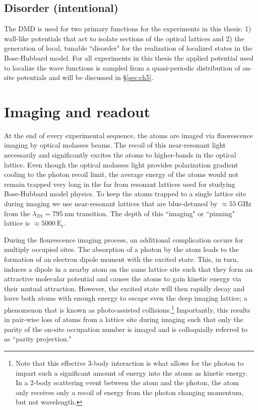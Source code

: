 \subsection{Disorder (intentional)}

The DMD is used for two primary functions for the experiments in this thesis: 1) wall-like potentials that act to isolate sections of the optical lattices and 2) the generation of local, tunable ``disorder" for the realization of localized states in the Bose-Hubbard model. For all experiments in this thesis the applied potential used to localize the wave functions is sampled from a quasi-periodic distribution of on-site potentials and will be discussed in \S \ref{sec:ch5}.

\section{Imaging and readout}

At the end of every experimental sequence, the atoms are imaged via fluorescence imaging by optical molasses beams. The recoil of this near-resonant light necessarily and significantly excites the atoms to higher-bands in the optical lattice. Even though the optical molasses light provides polarization gradient cooling to the photon recoil limit, the average energy of the atoms would not remain trapped very long in the far from resonant lattices used for studying Bose-Hubbard model physics. To keep the atoms trapped to a single lattice site during imaging we use near-resonant lattices that are blue-detuned by $\approx 55~\mathrm{GHz}$ from the $\lambda_{D1} = 795 ~\mathrm{nm}$ transition. The depth of this ``imaging" or ``pinning" lattice is $\approx 5000 ~\mathrm{E_r}$. 

During the flourescence imaging process, an additional complication occurs for multiply occupied sites. The absorption of a photon by the atom leads to the formation of an electron dipole moment with the excited state. This, in turn, induces a dipole in a nearby atom on the same lattice site such that they form an attractive molecular potential and causes the atoms to gain kinetic energy via their mutual attraction. However, the excited state will then rapidly decay and leave both atoms with enough energy to escape even the deep imaging lattice; a phenomenon that is known as photo-assisted collisions\cite{DePue1999,Bakr2009}.\footnote{Note that this effective $3$-body interaction is what allows for the photon to impart such a significant amount of energy into the atoms as kinetic energy. In a $2$-body scattering event between the atom and the photon, the atom only receives only a recoil of energy from the photon changing momentum, but not wavelength.} Importantly, this results in pair-wise loss of atoms from a lattice site during imaging such that only the parity of the on-site occupation number is imaged and is colloquially referred to as ``parity projection."

